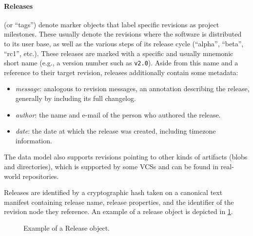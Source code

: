\paragraph{\textbf{Releases}} (or ``tags'') denote marker objects that label
specific revisions as project milestones. These usually denote the revisions
where the software is distributed to its user base, as well as the various
steps of its release cycle (``alpha'', ``beta'', ``rc1'', etc.). These releases
are marked with a specific and usually mnemonic short name (e.g., a version
number such as \texttt{v2.0}). Aside from this name and a reference to their
target revision, releases additionally contain some metadata:

\begin{itemize}
    \setlength\itemsep{0em}
    \item \emph{message}: analogous to revision messages, an annotation
        describing the release, generally by including its full changelog.
    \item \emph{author}: the name and e-mail of the person who authored the
        release.
    \item \emph{date}: the date at which the release was created, including
        timezone information.
\end{itemize}

The data model also supports revisions pointing to other kinds of artifacts
(blobs and directories), which is supported by some \glspl{VCS} and can be
found in real-world repositories.

Releases are identified by a cryptographic hash taken on a canonical text
manifest containing release name, release properties, and the identifier of the
revision node they reference.
An example of a release object is depicted in \cref{fig:release-example}.

\begin{figure}[ht]
    \centering
\caption{Example of a Release object.}%
\label{fig:release-example}
\end{figure}



